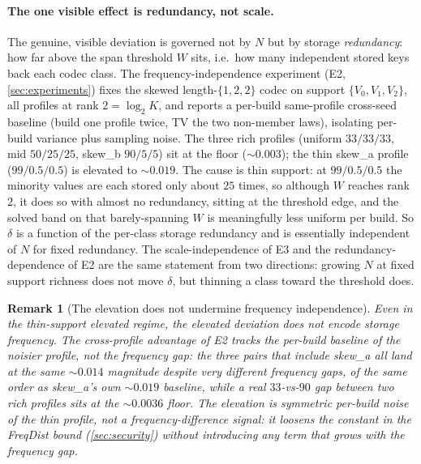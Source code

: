 \documentclass[sigconf,nonacm,anonymous,balance=false]{acmart}
\newtheorem{remark}{Remark}
\newcommand{\W}{W}                          %
\begin{document}
\paragraph{The one visible effect is redundancy, not scale.}
The genuine, visible deviation is governed not by $N$ but by storage
\emph{redundancy}: how far above the span threshold $\W$ sits, i.e.\ how many independent
stored keys back each codec class. The frequency-independence experiment (E2,
\cref{sec:experiments}) fixes the skewed length-$\{1,2,2\}$ codec on support
$\{V_0, V_1, V_2\}$, all profiles at rank $2 = \log_2 K$, and reports a per-build
same-profile cross-seed baseline (build one profile twice, TV the two non-member laws),
isolating per-build variance plus sampling noise. The three rich profiles (uniform
$33/33/33$, mid $50/25/25$, skew\_b $90/5/5$) sit at the floor ($\sim 0.003$); the thin
skew\_a profile ($99/0.5/0.5$) is elevated to $\sim 0.019$. The cause is thin support:
at $99/0.5/0.5$ the minority values are each stored only about $25$ times, so although
$\W$ reaches rank $2$, it does so with almost no redundancy, sitting at the threshold
edge, and the solved band on that barely-spanning $\W$ is meaningfully less uniform per
build. So $\delta$ is a function of the per-class storage redundancy and is essentially
independent of $N$ for fixed redundancy. The scale-independence of E3 and the
redundancy-dependence of E2 are the same statement from two directions: growing $N$ at
fixed support richness does not move $\delta$, but thinning a class toward the threshold
does.

\begin{remark}[The elevation does not undermine frequency independence]
\label{rem:elevation}
Even in the thin-support elevated regime, the elevated deviation does \emph{not} encode
storage frequency. The cross-profile advantage of E2 tracks the per-build baseline of
the noisier profile, not the frequency gap: the three pairs that include skew\_a all land
at the same $\sim 0.014$ magnitude despite very different frequency gaps, of the same
order as skew\_a's own $\sim 0.019$ baseline, while a real $33$-vs-$90$ gap between two
\emph{rich} profiles sits at the $\sim 0.0036$ floor. The elevation is symmetric
per-build noise of the thin profile, not a frequency-difference signal: it loosens the
constant in the FreqDist bound (\cref{sec:security}) without introducing any term that
grows with the frequency gap.
\end{remark}
\end{document}
